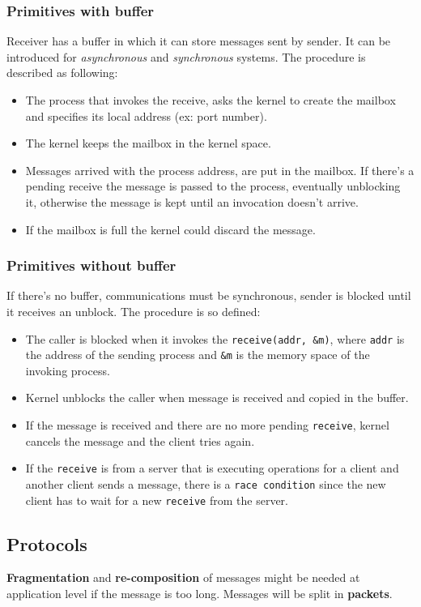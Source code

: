\documentclass[11pt,a4paper]{article}
\begin{document}
\subsubsection{Primitives with buffer}
Receiver has a buffer in which it can store messages sent by sender. It can be introduced for \textit{asynchronous} and \textit{synchronous} systems. The procedure is described as following:
\begin{itemize}
	\item The process that invokes the receive, asks the kernel to create the mailbox and specifies its local address (ex: port number).
	\item The kernel keeps the mailbox in the kernel space.
	\item Messages arrived with the process address, are put in the mailbox. If there's a pending receive the message is passed to the process, eventually unblocking it, otherwise the message is kept until an invocation doesn't arrive.
	\item If the mailbox is full the kernel could discard the message. 
\end{itemize}

\subsubsection{Primitives without buffer}
If there's no buffer, communications must be synchronous, sender is blocked until it receives an unblock. The procedure is so defined:
\begin{itemize}
	\item The caller is blocked when it invokes the \verb!receive(addr, &m)!, where \verb!addr! is the address of the sending process and \verb!&m! is the memory space of the invoking process.
	\item Kernel unblocks the caller when message is received and copied in the buffer.
	\item If the message is received and there are no more pending \verb!receive!, kernel cancels the message and the client tries again.
	\item If the \verb!receive! is from a server that is executing operations for a client and another client sends a message, there is a \verb!race condition! since the new client has to wait for a new \verb!receive! from the server.
\end{itemize}
   
\subsection{Protocols}
\textbf{Fragmentation} and \textbf{re-composition} of messages might be needed at application level if the message is too long. Messages will be split in \textbf{packets}.
\end{document}
